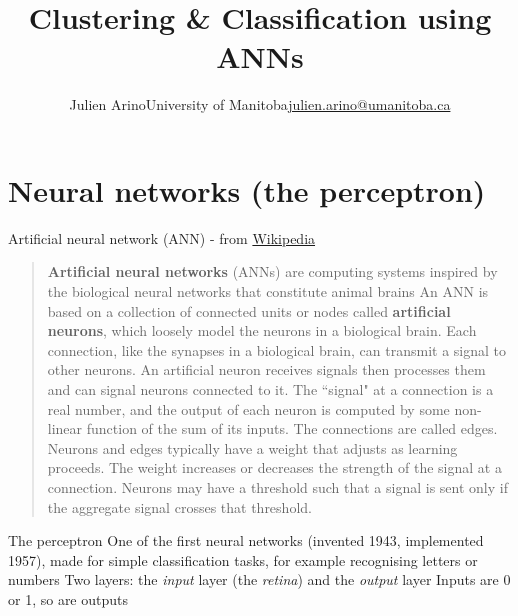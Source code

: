 \documentclass[aspectratio=169]{beamer}\usepackage[]{graphicx}\usepackage[]{xcolor}
\title{Clustering \& Classification using ANNs}
\author{\texorpdfstring{Julien Arino\newline University of Manitoba\newline\url{julien.arino@umanitoba.ca}}{Julien Arino}}
\date{}
\begin{document}

\section{Neural networks (the perceptron)}

\begin{frame}{Artificial neural network (ANN) - from \href{https://en.wikipedia.org/wiki/Artificial_neural_network}{Wikipedia}}
    \begin{quote}
    \textbf{Artificial neural networks} (ANNs) are computing systems inspired by the biological neural networks that constitute animal brains
    \vfill
    An ANN is based on a collection of connected units or nodes called \textbf{artificial neurons}, which loosely model the neurons in a biological brain. Each connection, like the synapses in a biological brain, can transmit a signal to other neurons. An artificial neuron receives signals then processes them and can signal neurons connected to it. The ``signal" at a connection is a real number, and the output of each neuron is computed by some non-linear function of the sum of its inputs. The connections are called edges. Neurons and edges typically have a weight that adjusts as learning proceeds. The weight increases or decreases the strength of the signal at a connection. Neurons may have a threshold such that a signal is sent only if the aggregate signal crosses that threshold.
    \end{quote}
\end{frame}


\begin{frame}{The perceptron}
    One of the first neural networks (invented 1943, implemented 1957), made for simple classification tasks, for example recognising letters or numbers
    \vfill
    Two layers: the \emph{input} layer (the \emph{retina}) and the \emph{output} layer
    \vfill
    Inputs are 0 or 1, so are outputs
\end{frame}
\end{document}
